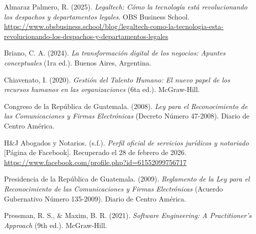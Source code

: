 \documentclass[12pt, letterpaper]{article}
\begin{document}
\begin{singlespace}

\noindent
\hangindent=1.27cm
Almaraz Palmero, R. (2025). \textit{Legaltech: Cómo la tecnología está revolucionando los despachos y departamentos legales}. OBS Business School. \\
\hspace*{1.27cm}\url{https://www.obsbusiness.school/blog/legaltech-como-la-tecnologia-esta-revolucionando-los-despachos-y-departamentos-legales}

\vspace{6pt}
\noindent
\hangindent=1.27cm
Briano, C. A. (2024). \textit{La transformación digital de los negocios: Apuntes conceptuales} (1ra ed.). Buenos Aires, Argentina.

\vspace{6pt}
\noindent
\hangindent=1.27cm
Chiavenato, I. (2020). \textit{Gestión del Talento Humano: El nuevo papel de los recursos humanos en las organizaciones} (6ta ed.). McGraw-Hill.

\vspace{6pt}
\noindent
\hangindent=1.27cm
Congreso de la República de Guatemala. (2008). \textit{Ley para el Reconocimiento de las Comunicaciones y Firmas Electrónicas} (Decreto Número 47-2008). Diario de Centro América.

\vspace{6pt}
\noindent
\hangindent=1.27cm
H\&J Abogados y Notarios. (s.f.). \textit{Perfil oficial de servicios jurídicos y notariado} [Página de Facebook]. Recuperado el 28 de febrero de 2026. \\
\hspace*{1.27cm}\url{https://www.facebook.com/profile.php?id=61552099756717}

\vspace{6pt}
\noindent
\hangindent=1.27cm
Presidencia de la República de Guatemala. (2009). \textit{Reglamento de la Ley para el Reconocimiento de las Comunicaciones y Firmas Electrónicas} (Acuerdo Gubernativo Número 135-2009). Diario de Centro América.

\vspace{6pt}
\noindent
\hangindent=1.27cm
Pressman, R. S., \& Maxim, B. R. (2021). \textit{Software Engineering: A Practitioner's Approach} (9th ed.). McGraw-Hill.

\end{singlespace}
\end{document}
